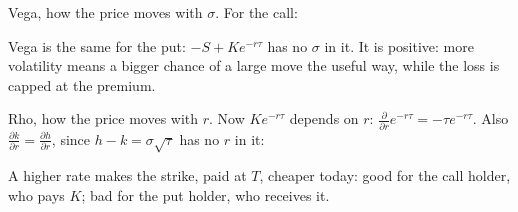 \begin{steps}[resume]
\item\label{s:cvega} Vega, how the price moves with $\sigma$. For the call:
\begin{deriv}
\end{deriv}
Vega is the same for the put: $-S+Ke^{-r\tau}$ has no $\sigma$ in it. It is positive: more volatility means a bigger chance of a large move the useful way, while the loss is capped at the premium.

\item\label{s:crho} Rho, how the price moves with $r$. Now $Ke^{-r\tau}$ depends on $r$: $\frac{\partial}{\partial r}e^{-r\tau}=-\tau e^{-r\tau}$. Also $\frac{\partial k}{\partial r}=\frac{\partial h}{\partial r}$, since $h-k=\sigma\sqrt\tau$ has no $r$ in it:
\begin{deriv}
\end{deriv}
A higher rate makes the strike, paid at $T$, cheaper today: good for the call holder, who pays $K$; bad for the put holder, who receives it.
\end{steps}

